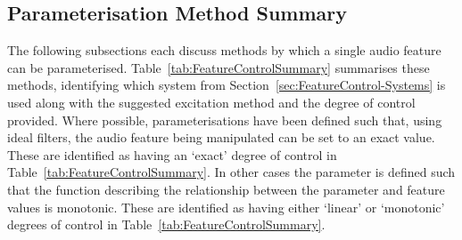 	\subsection{Parameterisation Method Summary}
		The following subsections each discuss methods by which a single audio feature can be parameterised.
		Table~\ref{tab:FeatureControlSummary} summarises these methods, identifying which system from
		Section~\ref{sec:FeatureControl-Systems} is used along with the suggested excitation method and the degree
		of control provided. Where possible, parameterisations have been defined such that, using ideal filters,
		the audio feature being manipulated can be set to an exact value. These are identified as having an `exact'
		degree of control in Table~\ref{tab:FeatureControlSummary}. In other cases the parameter is defined such
		that the function describing the relationship between the parameter and feature values is monotonic. These
		are identified as having either `linear' or `monotonic' degrees of control in
		Table~\ref{tab:FeatureControlSummary}. 
		
